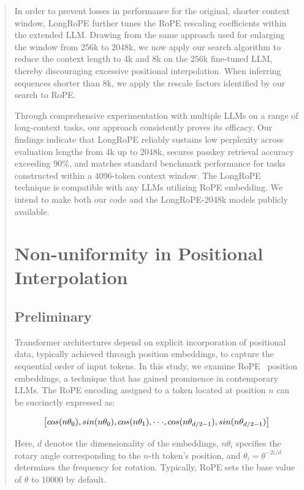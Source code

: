 \begin{abstract}
In order to prevent losses in performance for the original, shorter context window, {LongRoPE} further tunes the RoPE rescaling coefficients within the extended LLM. Drawing from the same approach used for enlarging the window from 256k to 2048k, we now apply our search algorithm to reduce the context length to 4k and 8k on the 256k fine-tuned LLM, thereby discouraging excessive positional interpolation. When inferring sequences shorter than 8k, we apply the rescale factors identified by our search to RoPE.

Through comprehensive experimentation with multiple LLMs on a range of long-context tasks, our approach consistently proves its efficacy. Our findings indicate that LongRoPE reliably sustains low perplexity across evaluation lengths from 4k up to 2048k, secures passkey retrieval accuracy exceeding 90\%, and matches standard benchmark performance for tasks constructed within a 4096-token context window. The LongRoPE technique is compatible with any LLMs utilizing RoPE embedding. We intend to make both our code and the LongRoPE-2048k models publicly available.

\section{Non-uniformity in Positional Interpolation}
\label{sec:analysis}

\subsection{Preliminary}

Transformer architectures depend on explicit incorporation of positional data, typically achieved through position embeddings, to capture the sequential order of input tokens. In this study, we examine RoPE~\cite{rope} position embeddings, a technique that has gained prominence in contemporary LLMs. The RoPE encoding assigned to a token located at position $n$ can be succinctly expressed as:

\begin{equation}
		\fontsize{7.8}{7.8} \selectfont
	\label{eq:rope}
	\left[ cos(n\theta_0), sin(n\theta_0), cos(n\theta_1), \cdot\cdot\cdot, cos(n\theta_{d/2-1}), sin(n\theta_{d/2-1}) \right]   
\end{equation}

Here, $d$ denotes the dimensionality of the embeddings, $n\theta_i$ specifies the rotary angle corresponding to the $n$-th token’s position, and $\theta_i=\theta^{-2i/d}$ determines the frequency for rotation. Typically, RoPE sets the base value of $\theta$ to 10000 by default.


\end{abstract}
